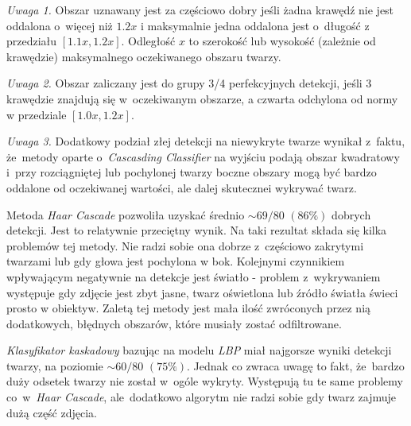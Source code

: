 \textit{Uwaga 1.}\label{uwaga:czesciowo_dobry} Obszar uznawany jest za częściowo dobry jeśli żadna krawędź nie jest oddalona o~więcej niż $1.2x$ i maksymalnie jedna oddalona jest o~długość z przedziału $[1.1x, 1.2x]$. Odległość $x$ to szerokość lub wysokość (zależnie od krawędzie) maksymalnego oczekiwanego obszaru twarzy.

\par

\textit{Uwaga 2.}\label{uwaga:3_4_perfekcyjny} Obszar zaliczany jest do grupy 3/4 perfekcyjnych detekcji, jeśli 3 krawędzie znajdują się w~oczekiwanym obszarze, a czwarta odchylona od normy w przedziale $[1.0x, 1.2x]$.

\par 

\textit{Uwaga 3.}\label{uwaga:dodatkowy_zle} Dodatkowy podział złej detekcji na niewykryte twarze wynikał z~faktu, że~metody oparte o~\textit{Cascasding Classifier} na wyjściu podają obszar kwadratowy i~przy rozciągniętej lub pochylonej twarzy boczne obszary mogą być bardzo oddalone od oczekiwanej wartości, ale dalej skutecznei wykrywać twarz. 

\vspace{10mm}




Metoda \textit{Haar Cascade} pozwoliła uzyskać średnio $\sim69/80$ $(86\%)$ dobrych detekcji. Jest to relatywnie przeciętny wynik. Na taki rezultat składa się kilka problemów tej metody. Nie radzi sobie ona dobrze z~częściowo zakrytymi twarzami lub gdy głowa jest pochylona w bok. Kolejnymi czynnikiem wpływającym negatywnie na detekcje jest światło - problem z~wykrywaniem występuje gdy zdjęcie jest zbyt jasne, twarz oświetlona lub źródło światła świeci prosto w obiektyw. Zaletą tej metody jest mała ilość zwróconych przez nią dodatkowych, błędnych obszarów, które musiały zostać odfiltrowane.

\par

\textit{Klasyfikator kaskadowy} bazując na modelu \textit{LBP} miał najgorsze wyniki detekcji twarzy, na poziomie $\sim60/80$ $(75 \%)$. Jednak co zwraca uwagę to fakt, że~bardzo duży odsetek twarzy nie został w~ogóle wykryty. Występują tu te same problemy co~w~\textit{Haar Cascade}, ale~dodatkowo algorytm nie radzi sobie gdy twarz zajmuje dużą część zdjęcia.

\par

